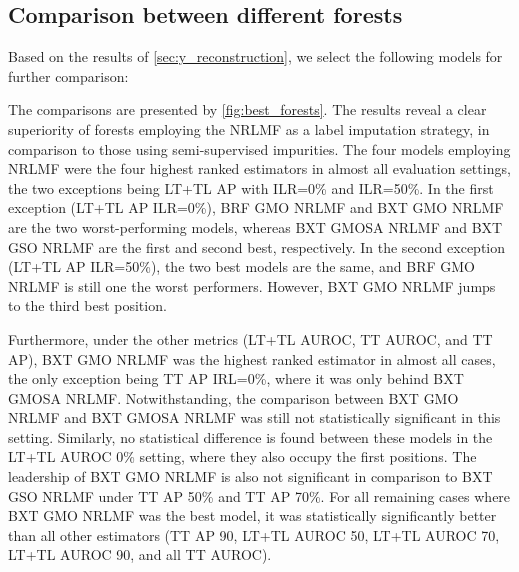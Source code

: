 \subsection{Comparison between different forests}  %
\label{sec:best_forests}

Based on the results of \autoref{sec:y_reconstruction}, we select the following models for further comparison:


The comparisons are presented by \autoref{fig:best_forests}. The results reveal a clear superiority of forests employing the NRLMF as a label imputation strategy, in comparison to those using semi-supervised impurities. The four models employing NRLMF were the four highest ranked estimators in almost all evaluation settings, the two exceptions being LT+TL AP with ILR=0\% and ILR=50\%. In the first exception (LT+TL AP ILR=0\%), BRF GMO NRLMF and BXT GMO NRLMF are the two worst-performing models, whereas BXT GMOSA NRLMF and BXT GSO NRLMF are the first and second best, respectively. In the second exception (LT+TL AP ILR=50\%), the two best models are the same, and BRF GMO NRLMF is still one the worst performers. However, BXT GMO NRLMF jumps to the third best position. 


Furthermore, under the other metrics (LT+TL AUROC, TT AUROC, and TT AP), BXT GMO NRLMF was the highest ranked estimator in almost all cases, the only exception being TT AP IRL=0\%, where it was only behind BXT GMOSA NRLMF. Notwithstanding, the comparison between BXT GMO NRLMF and BXT GMOSA NRLMF was still not statistically significant in this setting. Similarly, no statistical difference is found between these models in the LT+TL AUROC 0\% setting, where they also occupy the first positions. The leadership of BXT GMO NRLMF is also not significant in comparison to BXT GSO NRLMF under TT AP 50\% and TT AP 70\%. For all remaining cases where BXT GMO NRLMF was the best model, it was statistically significantly better than all other estimators (TT AP 90, LT+TL AUROC 50, LT+TL AUROC 70, LT+TL AUROC 90, and all TT AUROC).


